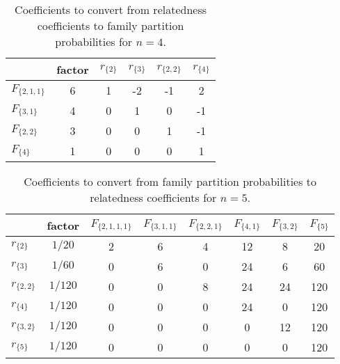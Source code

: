 \begin{table}[h]
\centering
\caption{Coefficients to convert from relatedness coefficients to family partition probabilities for $n=4$.}
\label{rho2psi4}
\begin{tabular}{lccccc}
\toprule
                &  factor &  $r_{\{2\}}$ &  $r_{\{3\}}$ &  $r_{\{2,2\}}$ &  $r_{\{4\}}$ \\
\midrule
$F_{\{2,1,1\}}$ &       6 &            1 &           -2 &             -1 &            2 \\
  $F_{\{3,1\}}$ &       4 &            0 &            1 &              0 &           -1 \\
  $F_{\{2,2\}}$ &       3 &            0 &            0 &              1 &           -1 \\
    $F_{\{4\}}$ &       1 &            0 &            0 &              0 &            1 \\
\bottomrule
\end{tabular}
\end{table}

\begin{table}[h]
\centering
\caption{Coefficients to convert from family partition probabilities to relatedness coefficients for $n=5$.}
\label{psi2rho5}
\begin{tabular}{lccccccc}
\toprule
              &  factor &  $F_{\{2,1,1,1\}}$ &  $F_{\{3,1,1\}}$ &  $F_{\{2,2,1\}}$ &  $F_{\{4,1\}}$ &  $F_{\{3,2\}}$ &  $F_{\{5\}}$ \\
\midrule
  $r_{\{2\}}$ &  $1/20$ &                  2 &                6 &                4 &             12 &              8 &           20 \\
  $r_{\{3\}}$ &  $1/60$ &                  0 &                6 &                0 &             24 &              6 &           60 \\
$r_{\{2,2\}}$ & $1/120$ &                  0 &                0 &                8 &             24 &             24 &          120 \\
  $r_{\{4\}}$ & $1/120$ &                  0 &                0 &                0 &             24 &              0 &          120 \\
$r_{\{3,2\}}$ & $1/120$ &                  0 &                0 &                0 &              0 &             12 &          120 \\
  $r_{\{5\}}$ & $1/120$ &                  0 &                0 &                0 &              0 &              0 &          120 \\
\bottomrule
\end{tabular}
\end{table}

